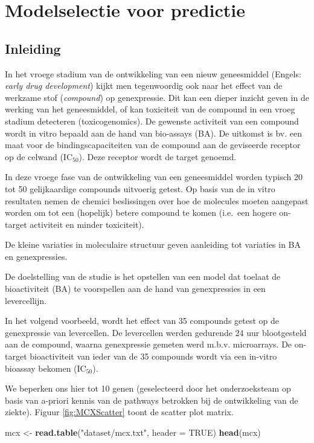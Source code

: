 \documentclass[12pt,dutch,coursenotes]{book}
\newenvironment{Shaded}{\begin{snugshade}}{\end{snugshade}}
\newcommand{\KeywordTok}[1]{\textcolor[rgb]{0.13,0.29,0.53}{\textbf{#1}}}
\newcommand{\DataTypeTok}[1]{\textcolor[rgb]{0.13,0.29,0.53}{#1}}
\newcommand{\StringTok}[1]{\textcolor[rgb]{0.31,0.60,0.02}{#1}}
\newcommand{\OtherTok}[1]{\textcolor[rgb]{0.56,0.35,0.01}{#1}}
\newcommand{\NormalTok}[1]{#1}
\theoremstyle{definition}
\theoremstyle{definition}
\theoremstyle{definition}
\theoremstyle{remark}
\begin{document}
\section{Modelselectie voor
predictie}\label{modelselectie-voor-predictie}

\subsection{Inleiding}\label{inleiding-10}

In het vroege stadium van de ontwikkeling van een nieuw geneesmiddel
(Engels: \emph{early drug development}) kijkt men tegenwoordig ook naar
het effect van de werkzame stof (\emph{compound}) op genexpressie. Dit
kan een dieper inzicht geven in de werking van het geneesmiddel, of kan
toxiciteit van de compound in een vroeg stadium detecteren
(toxicogenomics). De gewenste activiteit van een compound wordt in vitro
bepaald aan de hand van bio-assays (BA). De uitkomst is bv. een maat
voor de bindingscapaciteiten van de compound aan de geviseerde receptor
op de celwand (IC\(_{50}\)). Deze receptor wordt de target genoemd.

In deze vroege fase van de ontwikkeling van een geneesmiddel worden
typisch 20 tot 50 gelijkaardige compounds uitvoerig getest. Op basis van
de in vitro resultaten nemen de chemici beslissingen over hoe de
molecules moeten aangepast worden om tot een (hopelijk) betere compound
te komen (i.e.~een hogere on-target activiteit en minder toxiciteit).

De kleine variaties in moleculaire structuur geven aanleiding tot
variaties in BA en genexpressies.

De doelstelling van de studie is het opstellen van een model dat toelaat
de bioactiviteit (BA) te voorspellen aan de hand van genexpressies in
een levercellijn.

In het volgend voorbeeld, wordt het effect van 35 compounds getest op de
genexpressie van levercellen. De levercellen werden gedurende 24 uur
blootgesteld aan de compound, waarna genexpressie gemeten werd m.b.v.
microarrays. De on-target bioactiviteit van ieder van de 35 compounds
wordt via een in-vitro bioassay bekomen (IC\(_{50}\)).

We beperken ons hier tot 10 genen (geselecteerd door het onderzoeksteam
op basis van a-priori kennis van de pathways betrokken bij de
ontwikkeling van de ziekte). Figuur \ref{fig:MCXScatter} toont de
scatter plot matrix.

\begin{Shaded}
\begin{Highlighting}[]
\NormalTok{mcx <-}\StringTok{ }\KeywordTok{read.table}\NormalTok{(}\StringTok{"dataset/mcx.txt"}\NormalTok{, }\DataTypeTok{header =} \OtherTok{TRUE}\NormalTok{)}
\KeywordTok{head}\NormalTok{(mcx)}
\end{Highlighting}
\end{Shaded}
\end{document}
